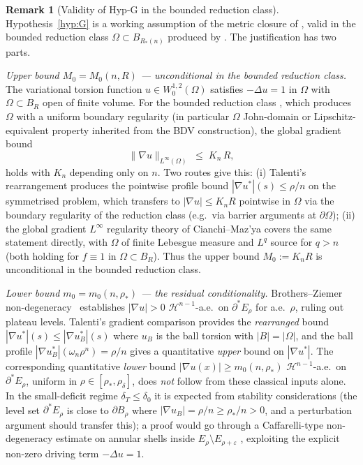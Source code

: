 \documentclass[11pt]{article}
\theoremstyle{definition}
\newtheorem{remark}[theorem]{Remark}
\newcommand{\Om}{\Omega}
\newcommand{\eps}{\varepsilon}
\newcommand{\rstar}{\rho_{*}}
\begin{document}
\begin{remark}[Validity of Hyp-G in the bounded reduction class]
\label{rem:hypG-validity}
Hypothesis~\ref{hyp:G} is a working assumption of the metric
closure of \cite{WeightedMetricTrace}, valid in the bounded reduction
class $\Om\subset B_{R_{*}(n)}$ produced by
\cite[Lemma~5.3]{GlobalAssembly}.  The justification has two parts.

\emph{Upper bound $M_{0}=M_{0}(n,R)$ --- unconditional in the bounded
reduction class.}
The variational torsion function $u\in W^{1,2}_{0}(\Om)$ satisfies
$-\Delta u=1$ in $\Om$ with $\Om\subset B_{R}$ open of finite volume.
For the bounded reduction class \cite[Lemma~5.3]{GlobalAssembly},
which produces $\Om$ with a uniform boundary regularity (in
particular $\Om$ John-domain or Lipschitz-equivalent property
inherited from the BDV construction), the global gradient bound
\[
   \|\nabla u\|_{L^{\infty}(\Om)}\;\le\;K_{n}\,R,
\]
holds with $K_{n}$ depending only on $n$.  Two routes give this:
(i) Talenti's rearrangement \cite{Talenti1976} produces the pointwise
profile bound $|\nabla u^{*}|(s)\le\rho/n$ on the symmetrised problem,
which transfers to $|\nabla u|\le K_{n}R$ pointwise in $\Om$ via the
boundary regularity of the reduction class (e.g.\ via barrier
arguments at $\partial\Om$);
(ii) the global gradient $L^{\infty}$ regularity theory of Cianchi--Maz'ya
\cite[Thm.~1.1, applied to the linear case $p=2$]{CianchiMaz'ya2011}
covers the same statement directly, with $\Om$ of finite Lebesgue
measure and $L^{q}$ source for $q>n$ (both holding for $f\equiv 1$ in
$\Om\subset B_{R}$).
Thus the upper bound $M_{0}:=K_{n}R$ is unconditional in the bounded
reduction class.

\emph{Lower bound $m_{0}=m_{0}(n,\rstar)$ --- the residual conditionality.}
Brothers--Ziemer non-degeneracy~\cite[Thm.~1]{BrothersZiemer1988}
establishes $|\nabla u|>0$ $\mathcal H^{n-1}$-a.e.\ on
$\partial^{*}E_{\rho}$ for a.e.\ $\rho$, ruling out plateau levels.
Talenti's gradient comparison \cite{Talenti1976} provides the
\emph{rearranged} bound $|\nabla u^{*}|(s)\le|\nabla u_{B}^{*}|(s)$
where $u_{B}$ is the ball torsion with $|B|=|\Om|$, and the ball
profile $|\nabla u_{B}^{*}|(\omega_{n}\rho^{n})=\rho/n$ gives a
quantitative \emph{upper} bound on $|\nabla u^{*}|$.  The corresponding
quantitative \emph{lower} bound $|\nabla u(x)|\ge m_{0}(n,\rstar)$
$\mathcal H^{n-1}$-a.e.\ on $\partial^{*}E_{\rho}$, uniform in
$\rho\in[\rstar,\rho_{\delta}]$, does \emph{not} follow from these
classical inputs alone.  In the small-deficit regime
$\delta_{T}\le\delta_{0}$ it is expected from stability considerations
(the level set $\partial^{*}E_{\rho}$ is close to $\partial B_{\rho}$
where $|\nabla u_{B}|=\rho/n\ge\rstar/n>0$, and a perturbation argument
should transfer this); a proof would go through a Caffarelli-type
non-degeneracy estimate on annular shells inside $E_{\rho}\setminus E_{\rho+\eps}$
\cite[\S 7]{CafCab1995}, exploiting the explicit non-zero
driving term $-\Delta u=1$.


\end{remark}
\end{document}
